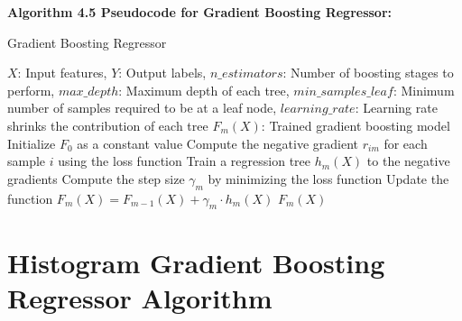 \textbf{Algorithm 4.5 Pseudocode for Gradient Boosting Regressor:}
\begin{algorithm}
\caption{Gradient Boosting Regressor}
\begin{algorithmic}[1]
\Require $X$: Input features, $Y$: Output labels, $n\_estimators$: Number of boosting stages to perform, $max\_depth$: Maximum depth of each tree, $min\_samples\_leaf$: Minimum number of samples required to be at a leaf node, $learning\_rate$: Learning rate shrinks the contribution of each tree
\Ensure $F_m(X)$: Trained gradient boosting model
    \State Initialize $F_0$ as a constant value
        \State Compute the negative gradient $r_{im}$ for each sample $i$ using the loss function
        \State Train a regression tree $h_m(X)$ to the negative gradients
        \State Compute the step size $\gamma_m$ by minimizing the loss function
        \State Update the function $F_m(X) = F_{m-1}(X) + \gamma_m \cdot h_m(X)$
    \EndFor
    \State \Return $F_m(X)$
\EndFunction
\end{algorithmic}
\end{algorithm}

\section{Histogram Gradient Boosting Regressor Algorithm}

